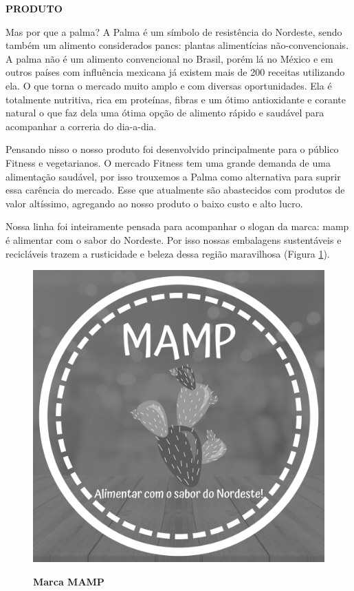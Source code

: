 \textbf{PRODUTO}

Mas por que a palma? A Palma é um símbolo de resistência do Nordeste, sendo também um alimento considerados pancs: plantas alimentícias não-convencionais. A palma não é um alimento convencional no Brasil, porém lá no México e em outros países com influência mexicana já existem mais de 200 receitas utilizando ela. O que torna o mercado muito amplo e com diversas oportunidades. Ela é totalmente nutritiva, rica em proteínas, fibras e um ótimo antioxidante e corante natural o que faz dela uma ótima opção de alimento rápido e saudável para acompanhar a correria do dia-a-dia.

Pensando nisso o nosso produto foi desenvolvido principalmente para o público Fitness e vegetarianos. O mercado Fitness tem uma grande demanda de uma alimentação saudável, por isso trouxemos a Palma como alternativa para suprir essa carência do mercado. Esse que atualmente são abastecidos com produtos de valor altíssimo, agregando ao nosso produto o baixo custo e alto lucro.

Nossa linha foi inteiramente pensada para acompanhar o slogan da marca: mamp é alimentar com o sabor do Nordeste. Por isso nossas embalagens sustentáveis e recicláveis trazem a rusticidade e beleza dessa região maravilhosa (Figura \ref{figura_22}).



\begin{figure}[H]
\centering
\caption{\textbf{Marca MAMP}}
\includegraphics[scale=0.1]{Imagens/mamp.png}
\label{figura_22}
\end{figure}



